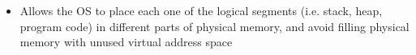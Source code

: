 \documentclass[12pt]{article}
\begin{document}
\begin{enumerate}[1.]
\begin{itemize}
\begin{itemize}
            \item Allows the OS to place each one of the logical segments (i.e. stack, heap, program code)
            in different parts of physical memory, and avoid filling physical memory with unused virtual address space
        \end{itemize}
    \end{itemize}


\end{enumerate}
\end{document}
